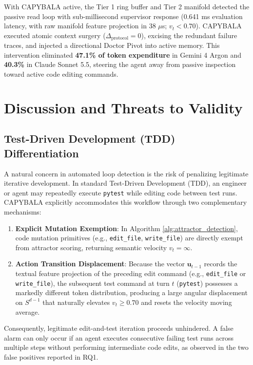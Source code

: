 \documentclass[journal]{IEEEtran}
\begin{document}
With CAPYBALA active, the Tier 1 ring buffer and Tier 2 manifold detected the passive read loop with sub-millisecond supervisor response (0.641 ms evaluation latency, with raw manifold feature projection in 38 $\mu$s; $v_t < 0.70$). CAPYBALA executed atomic context surgery ($\Delta_{\text{protocol}} = 0$), excising the redundant failure traces, and injected a directional Doctor Pivot into active memory. This intervention eliminated \textbf{47.1\% of token expenditure} in Gemini 4 Argon and \textbf{40.3\%} in Claude Sonnet 5.5, steering the agent away from passive inspection toward active code editing commands.

\section{Discussion and Threats to Validity}

\subsection{Test-Driven Development (TDD) Differentiation}
A natural concern in automated loop detection is the risk of penalizing legitimate iterative development. In standard Test-Driven Development (TDD), an engineer or agent may repeatedly execute \texttt{pytest} while editing code between test runs. CAPYBALA explicitly accommodates this workflow through two complementary mechanisms:
\begin{enumerate}[leftmargin=12pt, topsep=2pt, itemsep=1pt]
    \item \textbf{Explicit Mutation Exemption}: In Algorithm \ref{alg:attractor_detection}, code mutation primitives (e.g., \texttt{edit\_file}, \texttt{write\_file}) are directly exempt from attractor scoring, returning semantic velocity $v_t = \infty$.
    \item \textbf{Action Transition Displacement}: Because the vector $\mathbf{u}_{t-1}$ records the textual feature projection of the preceding edit command (e.g., \texttt{edit\_file} or \texttt{write\_file}), the subsequent test command at turn $t$ (\texttt{pytest}) possesses a markedly different token distribution, producing a large angular displacement on $S^{d-1}$ that naturally elevates $v_t \ge 0.70$ and resets the velocity moving average.
\end{enumerate}
Consequently, legitimate edit-and-test iteration proceeds unhindered. A false alarm can only occur if an agent executes consecutive failing test runs across multiple steps without performing intermediate code edits, as observed in the two false positives reported in RQ1.
\end{document}
